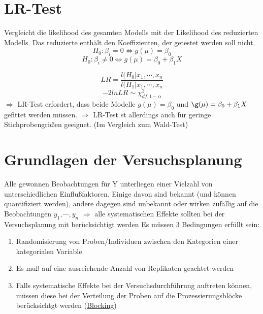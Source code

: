 \section{LR-Test}
Vergleicht die likelihood des gesamten Modells mit der Likelihood des reduzierten Modells. Das reduzierte enthält den Koeffizienten, der getestet werden soll nicht.
\[ H_0 : \beta_i = 0 \Leftrightarrow g(\mu) = \beta_0 \]
\[ H_0 : \beta_i \neq 0 \Leftrightarrow g(\mu) = \beta_0 + \beta_1 X \]

\[LR = \frac{l(H_0 | x_1,\cdots,x_n}{l(H_1 | x_1,\cdots,x_n}\]
\[ -2 ln LR \sim  \chi_{df,1-\alpha}^{2} \]
$\Rightarrow$ LR-Test erfordert, dass beide Modelle $g(\mu)=\beta_0$ und $\g(\mu)=\beta_0 + \beta_1 X$ gefittet werden müssen.
$\Rightarrow$ LR-Test st allerdings auch für geringe Stichprobengrößen geeignet. (Im Vergleich zum Wald-Test)

\section{Grundlagen der Versuchsplanung}
Alle gewonnen Beobachtungen für Y unterliegen einer Vielzahl von unterschiedlichen Einflußfaktoren. Einige davon sind bekannt (und können quantifiziert werden), andere dagegen sind unbekannt oder wirken zufällig auf die Beobachtungen $y_1,\cdots,y_n$
$\Rightarrow$ alle systematischen Effekte sollten bei der Versuchsplanung mit berücksichtigt werden 
Es müssen 3 Bedingungen erfüllt sein:
\begin{enumerate}
	\item Randomisierung von Proben/Individuen zwischen den Kategorien einer kategorialen Variable
	\item Es muß auf eine ausreichende Anzahl von Replikaten geachtet werden
	\item Falls systematische Effekte bei der Versuchsdurchführung auftreten können, müssen diese bei der Verteilung der Proben auf die Prozessierungsblöcke berücksichtgt werden (\underline{Blocking})
\end{enumerate}

